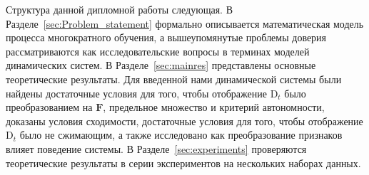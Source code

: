 Структура данной дипломной работы следующая. В Разделе~\ref{sec:Problem_statement} формально описывается математическая модель процесса многократного обучения, а вышеупомянутые проблемы доверия рассматриваются как исследовательские вопросы в терминах моделей динамических систем. В Разделе~\ref{sec:mainres} представлены основные теоретические результаты. Для введенной нами динамической системы были найдены достаточные условия для того, чтобы отображение $\text{D}_t$ было преобразованием на $\textbf{F}$, предельное множество и критерий автономности, доказаны условия сходимости, достаточные условия для того, чтобы отображение $\text{D}_t$ было не сжимающим, а также исследовано как преобразование признаков влияет поведение системы. В Разделе~\ref{sec:experiments} проверяются теоретические результаты в серии экспериментов на нескольких наборах данных.